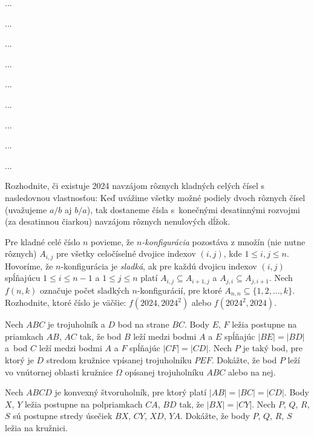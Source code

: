 {%
...}

{%
...}

{%
...}

{%
...}

{%
...}

{%
...}

{%
...}

{%
...}

{%
...}

{%
Rozhodnite, či existuje 2024 navzájom rôznych kladných celých čísel s nasledovnou vlastnosťou: Keď uvážime všetky možné podiely dvoch rôznych čísel (uvažujeme $a/b$ aj $b/a$), tak dostaneme čísla s~konečnými desatinnými rozvojmi (za desatinnou čiarkou) navzájom rôznych nenulových dĺžok.}

{%
Pre kladné celé číslo $n$ povieme, že \emph{$n$-konfigurácia} pozostáva z množín (nie nutne rôznych) $A_{i,j}$ pre všetky celočíselné dvojice indexov $(i, j)$, kde  $1\le i,j\le n$. Hovoríme, že $n$-konfigurácia je \emph{sladká}, ak pre každú dvojicu indexov $(i, j)$ spĺňajúcu  $1\le i\le n-1$ a $1\le j \le n$ platí $A_{i,j} \subseteq A_{i+1,j}$ a $A_{j,i} \subseteq A_{j,i+1}$. Nech $f(n, k)$ označuje počet sladkých $n$-konfigurácií, pre ktoré $A_{n,n}\subseteq \{1,2,\ldots, k\}$. Rozhodnite, ktoré číslo je väčšie: $f(2024,2024^2)$ alebo $f(2024^2,2024)$.}

{%
Nech $ABC$ je trojuholník a $D$ bod na strane $BC$.
Body $E$, $F$ ležia postupne na priamkach $AB$, $AC$ tak, že
bod $B$ leží medzi bodmi $A$ a $E$ spĺňajúc $|BE|=|BD|$ a~bod $C$ leží medzi bodmi $A$ a $F$ spĺňajúc $|CF|=|CD|$.
Nech $P$ je taký bod, pre ktorý je $D$ stredom kružnice vpísanej trojuholníku $PEF$. Dokážte, že bod $P$ leží vo vnútornej oblasti kružnice $\Omega$ opísanej trojuholníku $ABC$ alebo na nej.}

{%
Nech $ABCD$ je konvexný štvoruholník, pre ktorý platí $|AB| = |BC| = |CD|$. Body $X$, $Y$ ležia postupne na polpriamkach $CA$, $BD$ tak, že $|BX| = |CY|$. Nech $P$, $Q$, $R$, $S$ sú postupne stredy úsečiek $BX$, $CY$, $XD$, $YA$. Dokážte, že body $P$, $Q$, $R$, $S$ ležia na kružnici.}

